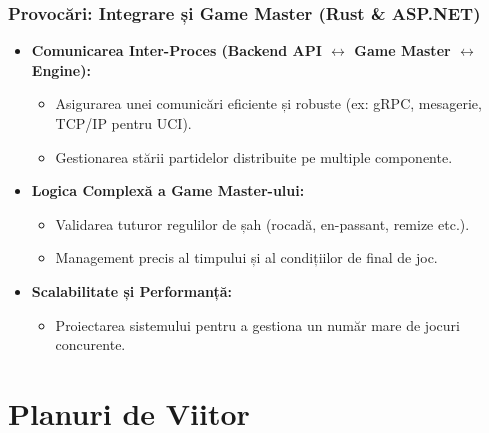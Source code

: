 \documentclass{beamer}
\begin{document}
\begin{frame}
    \frametitle{Provocări: Integrare și Game Master (Rust & ASP.NET)}
    \begin{itemize}
        \item \textbf{Comunicarea Inter-Proces (Backend API $\leftrightarrow$ Game Master $\leftrightarrow$ Engine):}
        \begin{itemize}
            \item Asigurarea unei comunicări eficiente și robuste (ex: gRPC, mesagerie, TCP/IP pentru UCI).
            \item Gestionarea stării partidelor distribuite pe multiple componente.
        \end{itemize}
        \item \textbf{Logica Complexă a Game Master-ului:}
        \begin{itemize}
            \item Validarea tuturor regulilor de șah (rocadă, en-passant, remize etc.).
            \item Management precis al timpului și al condițiilor de final de joc.
        \end{itemize}
        \item \textbf{Scalabilitate și Performanță:}
        \begin{itemize}
            \item Proiectarea sistemului pentru a gestiona un număr mare de jocuri concurente.
        \end{itemize}
    \end{itemize}
\end{frame}

\section{Planuri de Viitor}
\end{document}

